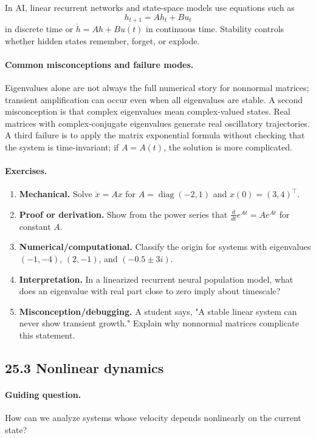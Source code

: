In AI, linear recurrent networks and state-space models use equations such as
\[
h_{t+1}=Ah_t+Bu_t
\]
in discrete time or \(\dot h=Ah+Bu(t)\) in continuous time. Stability controls whether hidden states remember, forget, or explode.

\paragraph{Common misconceptions and failure modes.}
Eigenvalues alone are not always the full numerical story for nonnormal matrices; transient amplification can occur even when all eigenvalues are stable. A second misconception is that complex eigenvalues mean complex-valued states. Real matrices with complex-conjugate eigenvalues generate real oscillatory trajectories. A third failure is to apply the matrix exponential formula without checking that the system is time-invariant; if \(A=A(t)\), the solution is more complicated.

\paragraph{Exercises.}
\begin{enumerate}[label=\textbf{25.2.\arabic*.}, leftmargin=*]
\item \textbf{Mechanical.} Solve \(\dot x=Ax\) for \(A=\operatorname{diag}(-2,1)\) and \(x(0)=(3,4)^\top\).
\item \textbf{Proof or derivation.} Show from the power series that \(\frac{d}{dt}e^{At}=Ae^{At}\) for constant \(A\).
\item \textbf{Numerical/computational.} Classify the origin for systems with eigenvalues \((-1,-4)\), \((2,-1)\), and \((-0.5\pm 3i)\).
\item \textbf{Interpretation.} In a linearized recurrent neural population model, what does an eigenvalue with real part close to zero imply about timescale?
\item \textbf{Misconception/debugging.} A student says, "A stable linear system can never show transient growth." Explain why nonnormal matrices complicate this statement.
\end{enumerate}

\subsection{25.3 Nonlinear dynamics}

\paragraph{Guiding question.}
How can we analyze systems whose velocity depends nonlinearly on the current state?

